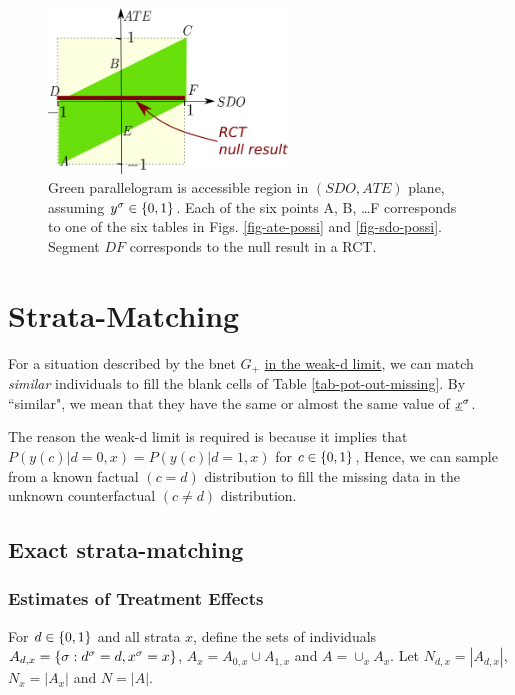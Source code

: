 \begin{figure}[h!]
\centering
\includegraphics[width=2.5in]
{pot-out/sdo-ate-polytope.png}
\caption{
Green parallelogram
is accessible region in
$(SDO,ATE)$ plane,
assuming $y^\sigma\in \{0,1\}$.
Each of the
six points A, B, \ldots F
corresponds to one of the six tables
in Figs. \ref{fig-ate-possi}
and \ref{fig-sdo-possi}.
Segment $DF$ 
corresponds to the null
result in a RCT. 
} 
\label{fig-sdo-ate-polytope}
\end{figure}



\section{Strata-Matching}
\label{sec-strata-matching}

For a situation
described by
the bnet $G_{+}$
\ul{ in the weak-d limit},
we can match {\it similar}
individuals to fill the blank cells of
 Table \ref{tab-pot-out-missing}.
By ``similar", we mean that
they have the same or almost the same
value of ${\underline{x}}^\sigma$.

The reason the weak-d limit
is required is because
it implies that $P(y(c)|d=0,x)=
P(y(c)|d=1,x)$ for $c\in \{0,1\}$,
Hence, we can sample from a 
known factual $(c=d)$
distribution to
fill  the missing data
in the unknown counterfactual $(c\neq d)$
distribution.





\subsection{Exact   strata-matching}

\subsubsection{Estimates of Treatment Effects}
\label{sec-estimates}
For $ d\in \{0,1\}$ and all strata $x$,
define the sets of individuals
$A_{ d,x}=\{\sigma:  d^\sigma= d, x^\sigma=x\}$,
$A_x=A_{0,x}\cup A_{1,x}$ and $A=\cup_x A_x$.
Let $N_{ d,x}=|A_{ d,x}|$,
$N_x= |A_x|$ and $N=|A|$.

